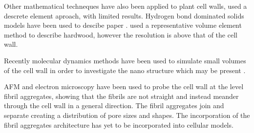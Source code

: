 Other mathematical techneques have also been applied to plant cell walls, \cite{HEPWORTH_1998} used a descrete element aproach, with limited results. Hydrogen bond dominated solids models have been used to descibe paper \cite{nissan1997link}\cite{batten1987unified}\cite{nissan1987unified}\cite{batten1987unified}. \cite{Zhan_2014} used a representative volume element method to describe hardwood, however the resolution is above that of the cell wall.

Recently molecular dynamics methods have been used to simulate small volumes of
the cell wall in order to investigate the nano structure which may be present \cite{Charlier_2012}\cite{Zhang_2009}\cite{Sangha_2011}\cite{houtman1995cellulose}.

AFM and electron microscopy have been used to probe the cell wall at the level fibril aggregates, showing that the fibrils are not straight and instead meander through the cell wall in a general direction. The fibril aggregates join and separate creating a distribution of pore sizes and shapes. The incorporation of the fibril aggregates architecture has yet to be incorporated into cellular models. 